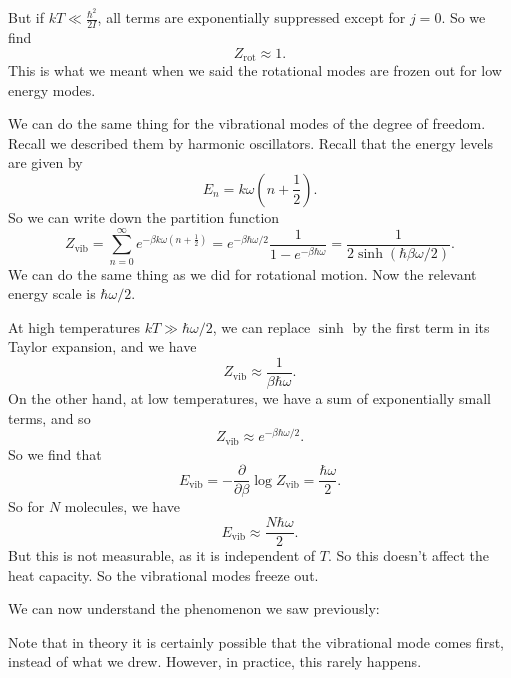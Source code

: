 \documentclass[a4paper]{article}
\begin{document}
But if $kT \ll \frac{\hbar^2}{2I}$, all terms are exponentially suppressed except for $j = 0$. So we find
\[
  Z_{\mathrm{rot}} \approx 1.
\]
This is what we meant when we said the rotational modes are frozen out for low energy modes.

We can do the same thing for the vibrational modes of the degree of freedom. Recall we described them by harmonic oscillators. Recall that the energy levels are given by
\[
  E_n = k \omega\left(n + \frac{1}{2}\right).
\]
So we can write down the partition function
\[
  Z_{\mathrm{vib}} = \sum_{n = 0}^\infty e^{-\beta k\omega\left(n + \frac{1}{2}\right)} = e^{-\beta \hbar \omega/2} \frac{1}{1 - e^{-\beta \hbar \omega}} = \frac{1}{2 \sinh (\hbar \beta \omega/2)}.
\]
We can do the same thing as we did for rotational motion. Now the relevant energy scale is $\hbar \omega/2$.

At high temperatures $kT \gg \hbar \omega/2$, we can replace $\sinh$ by the first term in its Taylor expansion, and we have
\[
  Z_{\mathrm{vib}} \approx \frac{1}{\beta \hbar \omega}.
\]
On the other hand, at low temperatures, we have a sum of exponentially small terms, and so
\[
  Z_{\mathrm{vib}} \approx e^{-\beta \hbar \omega /2}.
\]
So we find that
\[
  E_{\mathrm{vib}} = - \frac{\partial}{\partial \beta}\log Z_{\mathrm{vib}} = \frac{\hbar \omega}{2}.
\]
So for $N$ molecules, we have
\[
  E_{\mathrm{vib}} \approx \frac{N \hbar \omega}{2}.
\]
But this is not measurable, as it is independent of $T$. So this doesn't affect the heat capacity. So the vibrational modes freeze out.

We can now understand the phenomenon we saw previously:
\begin{center}
\end{center}
Note that in theory it is certainly possible that the vibrational mode comes first, instead of what we drew. However, in practice, this rarely happens.
\end{document}
